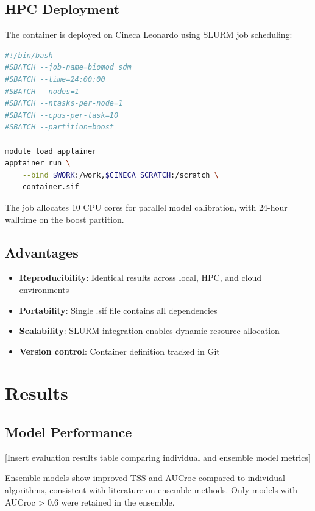 \documentclass[12pt,a4paper]{report}
\begin{document}
\section{HPC Deployment}

The container is deployed on Cineca Leonardo using SLURM job scheduling:

\begin{lstlisting}[language=bash]
#!/bin/bash
#SBATCH --job-name=biomod_sdm
#SBATCH --time=24:00:00
#SBATCH --nodes=1
#SBATCH --ntasks-per-node=1
#SBATCH --cpus-per-task=10
#SBATCH --partition=boost

module load apptainer
apptainer run \
    --bind $WORK:/work,$CINECA_SCRATCH:/scratch \
    container.sif
\end{lstlisting}

The job allocates 10 CPU cores for parallel model calibration, with 24-hour walltime on the boost partition.

\section{Advantages}

\begin{itemize}
    \item \textbf{Reproducibility}: Identical results across local, HPC, and cloud environments
    \item \textbf{Portability}: Single .sif file contains all dependencies
    \item \textbf{Scalability}: SLURM integration enables dynamic resource allocation
    \item \textbf{Version control}: Container definition tracked in Git
\end{itemize}

\chapter{Results}

\section{Model Performance}

[Insert evaluation results table comparing individual and ensemble model metrics]

Ensemble models show improved TSS and AUCroc compared to individual algorithms, consistent with literature on ensemble methods. Only models with AUCroc > 0.6 were retained in the ensemble.
\end{document}

